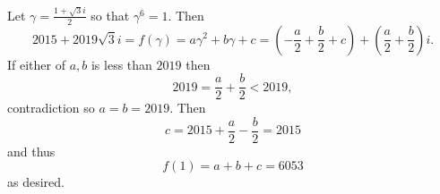 Let $\gamma=\frac{1+\sqrt{3}i}{2}$ so that $\gamma^6=1$. Then \[2015+2019\sqrt{3}i=f\left(\gamma\right)=a\gamma^2+b\gamma+c=\left(-\frac{a}{2}+\frac{b}{2}+c\right)+\left(\frac{a}{2}+\frac{b}{2}\right)i.\] If either of $a,b$ is less than $2019$ then \[2019=\frac{a}{2}+\frac{b}{2}<2019,\] contradiction so $a=b=2019$. Then \[c=2015+\frac{a}{2}-\frac{b}{2}=2015\] and thus \[f\left(1\right)=a+b+c=6\boxed{053}\] as desired.